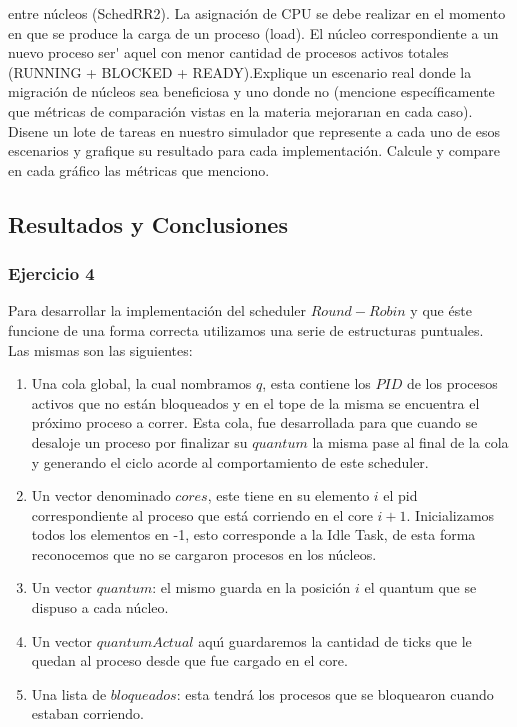 \begin{itemize}
entre n\'{u}cleos (SchedRR2). La asignación de CPU se debe realizar en el momento en que se produce la carga 
de un proceso (load). El n\'{u}cleo correspondiente a un nuevo proceso ser\'{} aquel
con menor cantidad de procesos activos totales (RUNNING + BLOCKED + READY).Explique un escenario real 
donde la migraci\'{o}n de n\'{u}cleos sea beneficiosa y uno donde no (mencione
espec\'{i}ficamente que m\'{e}tricas de comparaci\'{o}n vistas en la materia mejorarıan en cada caso).
Disene un lote de tareas en nuestro simulador que represente a cada uno de esos escenarios
y grafique su resultado para cada implementaci\'{o}n. Calcule y compare en cada gr\'{a}fico las
m\'{e}tricas que menciono.

\end{itemize}


\subsection{Resultados y Conclusiones}

\subsubsection[Resolución Ejercicio 4]{Ejercicio 4}
Para desarrollar la implementación del scheduler $Round-Robin$ y que \'{e}ste funcione de una forma correcta
utilizamos una serie de estructuras puntuales. \\
Las mismas son las siguientes:\\
\begin{enumerate}
 \item Una cola global, la cual nombramos $q$, esta contiene los $PID$ de los procesos activos que no est\'{a}n
 bloqueados y en el tope de la misma se encuentra el próximo proceso a correr. Esta cola,
 fue desarrollada para que cuando se desaloje un proceso por finalizar su $quantum$ la misma pase al final de
 la cola y generando el ciclo acorde al comportamiento de este scheduler.
 \item Un vector denominado $cores$, este tiene en su elemento $i$ el pid correspondiente 
 al proceso que está corriendo en el core $i+1$. Inicializamos todos los elementos en -1, esto
corresponde a la Idle Task, de esta forma reconocemos que no se cargaron procesos en los núcleos.
\item Un vector $quantum$: el mismo guarda en la posici\'on $i$ el quantum que se dispuso a cada núcleo.
\item Un vector $quantumActual$ aqu\'{\i} guardaremos la cantidad de ticks que le quedan al proceso
desde que fue cargado en el core.
\item Una lista de $bloqueados$: esta tendr\'{a} los procesos que se bloquearon cuando estaban corriendo.
\end{enumerate}

